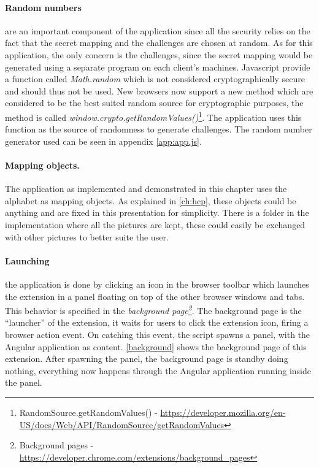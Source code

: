 \paragraph{Random numbers} are an important component of the application since all the security relies on the fact that the secret mapping and the challenges are chosen at random. As for this application, the only concern is the challenges, since the secret mapping would be generated using a separate program on each client's machines. Javascript provide a function called \emph{Math.random} which is not considered cryptographically secure~\cite{js-crypto} and should thus not be used. New browsers now support a new method which are considered to be the best suited random source for cryptographic purposes, the method is called \emph{window.crypto.getRandomValues()}\footnote{RandomSource.getRandomValues() - \url{https://developer.mozilla.org/en-US/docs/Web/API/RandomSource/getRandomValues}}. The application uses this function as the source of randomness to generate challenges. The random number generator used can be seen in appendix \ref{app:app.js}.

\paragraph{Mapping objects.} The application as implemented and demonstrated in this chapter uses the alphabet as mapping objects. As explained in \autoref{ch:hcp}, these objects could be anything and are fixed in this presentation for simplicity. There is a folder in the implementation where all the pictures are kept, these could easily be exchanged with other pictures to better suite the user. 

\paragraph{Launching} the application is done by clicking an icon in the browser toolbar which launches the extension in a panel floating on top of the other browser windows and tabs. This behavior is specified in the \emph{background page\footnote{Background pages - \url{https://developer.chrome.com/extensions/background_pages}}}. The background page is the ``launcher'' of the extension, it waits for users to click the extension icon, firing a browser action event. On catching this event, the script spawns a panel, with the Angular application as content. \autoref{background} shows the background page of this extension. After spawning the panel, the background page is standby doing nothing, everything now happens through the Angular application running inside the panel. 

